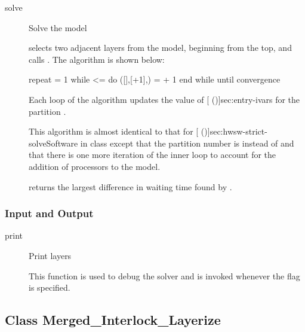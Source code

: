 \begin{description}

\item[solve] \texonly{---} Solve the model\\

 selects two adjacent layers from the model,
beginning from the top, and calls
.  The algorithm is
shown below:

\begin{example}
  repeat
     = 1
    while  <=  do
      ([],[+1],)
       =  + 1
    end while
  until convergence
\end{example}

Each loop of the algorithm updates the value of
[ (\Sec\Ref)]{sec:entry-ivars} for the partition
.  

This algorithm is almost identical to that for
[
(\Sec\Ref)]{sec:hwsw-strict-solveSoftware} in class
 except that the partition number is
 instead of  and that there is one more
iteration of the inner loop to account for the addition of processors
to the model.

 returns the largest difference in waiting time found by
.

\end{description}

\subsubsection{Input and Output}

\begin{description}
\item[print] \texonly{---} Print layers\\

This function is used to debug the solver and is invoked whenever the
 flag is specified.

\end{description}

\htmlrule
\subsection{Class Merged_Interlock_Layerize}
\label{sec:merged-interlock}

